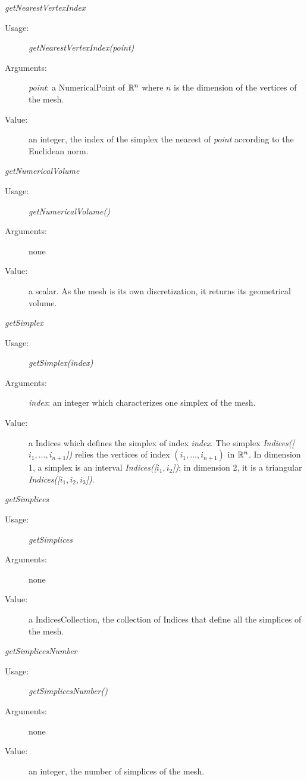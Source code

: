 \begin{description}
\begin{description}
\item \textit{getNearestVertexIndex}
\begin{description}
\item[Usage:] \textit{getNearestVertexIndex(point)}
\item[Arguments:] \textit{point}: a NumericalPoint of ${\mathbb R}^n$ where $n$ is the dimension of the vertices of the mesh.
\item[Value:] an integer, the index of the simplex the nearest of \textit{point} according to the Euclidean norm.
\end{description}
\bigskip


\item \textit{getNumericalVolume}
\begin{description}
\item[Usage:] \textit{getNumericalVolume()}
\item[Arguments:] none
\item[Value:] a scalar. As the mesh is its own discretization, it returns its geometrical volume.
\end{description}
\bigskip


\item \textit{getSimplex}
\begin{description}
\item[Usage:] \textit{getSimplex(index)}
\item[Arguments:] \textit{index}: an integer which  characterizes one simplex of the mesh.
\item[Value:] a Indices which defines the simplex of index \textit{index}.  The simplex \textit{Indices([$i_1,\dots, i_{n+1}$])} relies the vertices of index $(i_1,\dots, i_{n+1})$ in ${\mathbb R}^n$. In dimension 1, a simplex is an interval \textit{Indices([$i_1,i_2$])}; in dimension 2, it is a triangular \textit{Indices([$i_1,i_2, i_3$])}.
\end{description}
\bigskip


\item \textit{getSimplices}
\begin{description}
\item[Usage:] \textit{getSimplices}
\item[Arguments:] none
\item[Value:] a IndicesCollection, the collection of Indices that define all the simplices of the mesh.
\end{description}
\bigskip


\item \textit{getSimplicesNumber}
\begin{description}
\item[Usage:] \textit{getSimplicesNumber()}
\item[Arguments:] none
\item[Value:] an integer, the number of simplices of the mesh.
\end{description}
\bigskip



\end{description}
\end{description}

